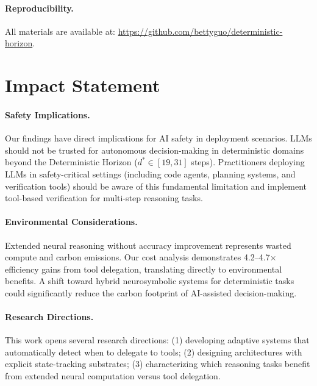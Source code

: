 \documentclass{article}
\theoremstyle{plain}
\theoremstyle{definition}
\theoremstyle{remark}
\begin{document}
\paragraph{Reproducibility.} All materials are available at: \url{https://github.com/bettyguo/deterministic-horizon}.


\section*{Impact Statement}

\paragraph{Safety Implications.} Our findings have direct implications for AI safety in deployment scenarios. LLMs should not be trusted for autonomous decision-making in deterministic domains beyond the Deterministic Horizon ($d^* \in [19,31]$ steps). Practitioners deploying LLMs in safety-critical settings (including code agents, planning systems, and verification tools) should be aware of this fundamental limitation and implement tool-based verification for multi-step reasoning tasks.

\paragraph{Environmental Considerations.} Extended neural reasoning without accuracy improvement represents wasted compute and carbon emissions. Our cost analysis demonstrates 4.2--4.7$\times$ efficiency gains from tool delegation, translating directly to environmental benefits. A shift toward hybrid neurosymbolic systems for deterministic tasks could significantly reduce the carbon footprint of AI-assisted decision-making.

\paragraph{Research Directions.} This work opens several research directions: (1) developing adaptive systems that automatically detect when to delegate to tools; (2) designing architectures with explicit state-tracking substrates; (3) characterizing which reasoning tasks benefit from extended neural computation versus tool delegation.
\end{document}
